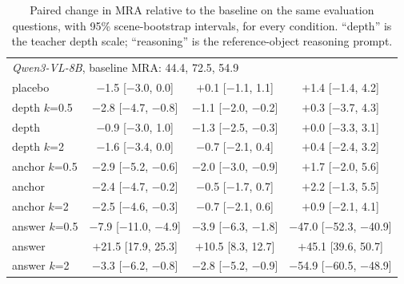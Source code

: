 \documentclass[letterpaper]{article} %
\begin{document}
\begin{table}[t]
\begin{tabular}{lccc}
\midrule
\multicolumn{4}{l}{\emph{Qwen3-VL-8B}, baseline MRA: 44.4, 72.5, 54.9} \\
placebo & $-$1.5 [$-$3.0, 0.0] & $+$0.1 [$-$1.1, 1.1] & $+$1.4 [$-$1.4, 4.2] \\
depth $k$=0.5 & $-$2.8 [$-$4.7, $-$0.8] & $-$1.1 [$-$2.0, $-$0.2] & $+$0.3 [$-$3.7, 4.3] \\
depth & $-$0.9 [$-$3.0, 1.0] & $-$1.3 [$-$2.5, $-$0.3] & $+$0.0 [$-$3.3, 3.1] \\
depth $k$=2 & $-$1.6 [$-$3.4, 0.0] & $-$0.7 [$-$2.1, 0.4] & $+$0.4 [$-$2.4, 3.2] \\
anchor $k$=0.5 & $-$2.9 [$-$5.2, $-$0.6] & $-$2.0 [$-$3.0, $-$0.9] & $+$1.7 [$-$2.0, 5.6] \\
anchor & $-$2.4 [$-$4.7, $-$0.2] & $-$0.5 [$-$1.7, 0.7] & $+$2.2 [$-$1.3, 5.5] \\
anchor $k$=2 & $-$2.5 [$-$4.6, $-$0.3] & $-$0.7 [$-$2.1, 0.6] & $+$0.9 [$-$2.1, 4.1] \\
answer $k$=0.5 & $-$7.9 [$-$11.0, $-$4.9] & $-$3.9 [$-$6.3, $-$1.8] & $-$47.0 [$-$52.3, $-$40.9] \\
answer & $+$21.5 [17.9, 25.3] & $+$10.5 [8.3, 12.7] & $+$45.1 [39.6, 50.7] \\
answer $k$=2 & $-$3.3 [$-$6.2, $-$0.8] & $-$2.8 [$-$5.2, $-$0.9] & $-$54.9 [$-$60.5, $-$48.9] \\
\bottomrule
\end{tabular}
\caption{Paired change in MRA relative to the baseline on the same evaluation questions, with 95\% scene-bootstrap intervals, for every condition. ``depth'' is the teacher depth scale; ``reasoning'' is the reference-object reasoning prompt.}
\label{tab:full}
\end{table}
\end{document}
